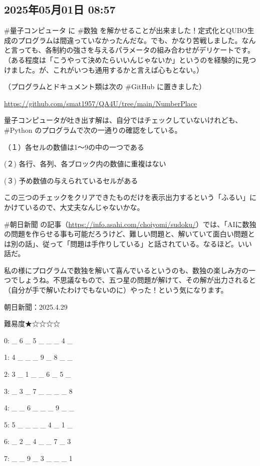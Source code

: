 \subsection*{2025年05月01日 08:57}

\#量子コンピュータ に \#数独 を解かせることが出来ました！定式化とQUBO生成のプログラムは間違っていなかったんだな。でも、かなり苦戦しました。なんと言っても、各制約の強さを与えるパラメータの組み合わせがデリケートです。（ある程度は「こうやって決めたらいいんじゃないか」というのを経験的に見つけました。が、これがいつも通用するかと言えば心もとない。）

（プログラムとドキュメント類は次の \#GitHub に置きました）

\url{https://github.com/smat1957/QA4U/tree/main/NumberPlace}

量子コンピュータが吐き出す解は、自分ではチェックしていないけれども、\#Python のプログラムで次の一通りの確認をしている。

（１）各セルの数値は1〜9の中の一つである

(２) 各行、各列、各ブロック内の数値に重複はない

(３) 予め数値の与えられているセルがある

この三つのチェックをクリアできたものだけを表示出力するという「ふるい」にかけているので、大丈夫なんじゃないかな。

\#朝日新聞 の記事（\url{https://info.asahi.com/choiyomi/sudoku/}）では、「AIに数独の問題を作らせる事も可能だろうけど、難しい問題と、解いていて面白い問題とは別の話」、従って「問題は手作りしている」と話されている。なるほど。いい話だ。

私の様にプログラムで数独を解いて喜んでいるというのも、数独の楽しみ方の一つでしょうね。不思議なもので、五つ星の問題が解けて、その解が出力されると（自分が手で解いたわけでもないのに）やった！という気になります。

朝日新聞：2025.4.29

難易度★☆☆☆☆

0: \_ 6 \_ 5 \_ \_ \_ 4 \_

1: 4 \_ \_ \_ 9 \_ 8 \_ \_

2: 3 \_ 1 \_ \_ 6 \_ 5 \_

3: \_ 3 \_ 7 \_ \_ \_ \_ 8

4: \_ \_ 6 \_ \_ \_ 9 \_ \_

5: 5 \_ \_ \_ \_ 4 \_ 1 \_

6: \_ 2 \_ 4 \_ \_ 7 \_ 3

7: \_ \_ 9 \_ 3 \_ \_ \_ 1

